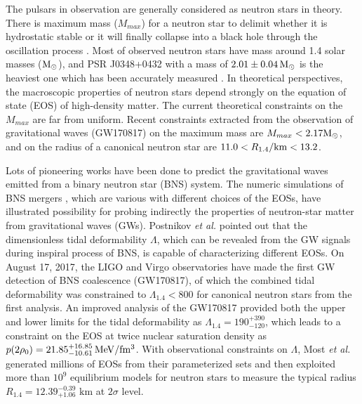 \documentclass[aps,prl,a4paper,twocolumn,floats,amsmath,amssymb,nofootinbib,showpacs]{revtex4-1}
\begin{document}
The pulsars in observation are generally considered as neutron stars in theory. There is maximum mass ($M_{max}$) for a neutron star to delimit whether it is hydrostatic stable or it will finally collapse into a black hole through the oscillation process \cite{Wen2019}. Most of observed neutron stars have mass around 1.4 solar masses ($\rm{M}_{\odot}$), and PSR J0348+0432 with a mass of $2.01 \pm 0.04 \, \rm{M}_{\odot}$ is the heaviest one which has been accurately measured \cite{Kiziltan2013,Antoniadis2012,Jacoby2006}. In theoretical perspectives, the macroscopic properties of neutron stars depend strongly on the equation of state (EOS) of high-density matter. The current theoretical constraints on the $M_{max}$ are far from uniform. Recent constraints extracted from the observation of gravitational waves (GW170817) on the  maximum mass are $M_{max} < 2.17\rm{M}_{\odot}$, and on the radius of a canonical neutron star are $11.0 < R_{1.4}/ \rm{km} < 13.2$.

Lots of pioneering works have been done to predict the gravitational waves emitted from a binary neutron star (BNS) system. The numeric simulations of BNS mergers \cite{Kim2005,Shen2012}, which are various with different choices of the EOSs, have illustrated possibility for probing indirectly the properties of neutron-star matter from gravitational waves (GWs). Postnikov \emph{et al.} pointed out that the dimensionless tidal deformability $\Lambda$, which can be revealed from the GW signals during inspiral process of BNS, is capable of characterizing different EOSs. On August 17, 2017, the LIGO and Virgo observatories have made the first GW detection of BNS coalescence (GW170817), of which the combined tidal deformability was constrained to $\Lambda_{1.4}  < 800$ for canonical neutron stars from the first analysis. An improved analysis of the GW170817 provided both the upper and lower limits for the tidal deformability as ${\Lambda _{1.4}} = 190_{ - 120}^{ + 390}$, which leads to a constraint on the EOS at twice nuclear saturation density as $p(2{\rho _0}) = 21.85_{ - 10.61}^{ + 16.85} \, \rm{MeV/fm^3}$. With observational constraints on $\Lambda$, Most \emph{et al.} generated millions of EOSs from their parameterized sets and then exploited more than $10^{9}$ equilibrium models for neutron stars to measure the typical radius ${R_{1.4}} = 12.39_{ + 1.06}^{ - 0.39}$ $\textrm{km}$ at $2\sigma $ level.
\end{document}
